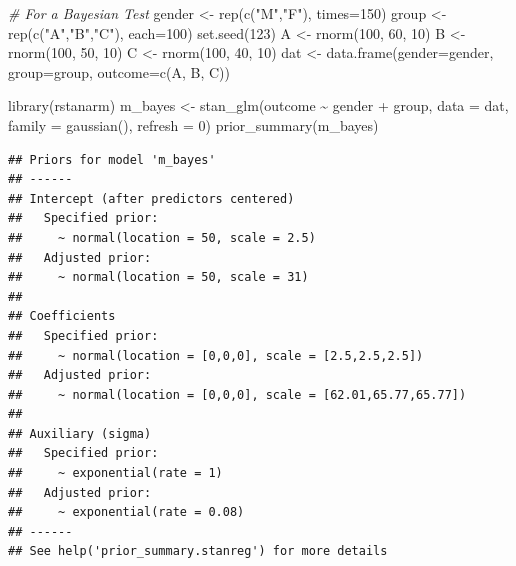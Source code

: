 \documentclass[
  ja=standard, xelatex, base=12pt]{bxjsreport}
\newenvironment{Shaded}{\begin{snugshade}}{\end{snugshade}}
\newcommand{\AttributeTok}[1]{\textcolor[rgb]{0.77,0.63,0.00}{#1}}
\newcommand{\CommentTok}[1]{\textcolor[rgb]{0.56,0.35,0.01}{\textit{#1}}}
\newcommand{\DecValTok}[1]{\textcolor[rgb]{0.00,0.00,0.81}{#1}}
\newcommand{\FunctionTok}[1]{\textcolor[rgb]{0.00,0.00,0.00}{#1}}
\newcommand{\NormalTok}[1]{#1}
\newcommand{\OtherTok}[1]{\textcolor[rgb]{0.56,0.35,0.01}{#1}}
\newcommand{\SpecialCharTok}[1]{\textcolor[rgb]{0.00,0.00,0.00}{#1}}
\newcommand{\StringTok}[1]{\textcolor[rgb]{0.31,0.60,0.02}{#1}}
\begin{document}
\begin{Shaded}
\begin{Highlighting}[]
\CommentTok{\# For a Bayesian Test }
\NormalTok{gender }\OtherTok{\textless{}{-}} \FunctionTok{rep}\NormalTok{(}\FunctionTok{c}\NormalTok{(}\StringTok{"M"}\NormalTok{,}\StringTok{"F"}\NormalTok{), }\AttributeTok{times=}\DecValTok{150}\NormalTok{)}
\NormalTok{group }\OtherTok{\textless{}{-}} \FunctionTok{rep}\NormalTok{(}\FunctionTok{c}\NormalTok{(}\StringTok{"A"}\NormalTok{,}\StringTok{"B"}\NormalTok{,}\StringTok{"C"}\NormalTok{), }\AttributeTok{each=}\DecValTok{100}\NormalTok{)}
\FunctionTok{set.seed}\NormalTok{(}\DecValTok{123}\NormalTok{)}
\NormalTok{A }\OtherTok{\textless{}{-}} \FunctionTok{rnorm}\NormalTok{(}\DecValTok{100}\NormalTok{, }\DecValTok{60}\NormalTok{, }\DecValTok{10}\NormalTok{)}
\NormalTok{B }\OtherTok{\textless{}{-}} \FunctionTok{rnorm}\NormalTok{(}\DecValTok{100}\NormalTok{, }\DecValTok{50}\NormalTok{, }\DecValTok{10}\NormalTok{)}
\NormalTok{C }\OtherTok{\textless{}{-}} \FunctionTok{rnorm}\NormalTok{(}\DecValTok{100}\NormalTok{, }\DecValTok{40}\NormalTok{, }\DecValTok{10}\NormalTok{)}
\NormalTok{dat }\OtherTok{\textless{}{-}} \FunctionTok{data.frame}\NormalTok{(}\AttributeTok{gender=}\NormalTok{gender, }\AttributeTok{group=}\NormalTok{group, }\AttributeTok{outcome=}\FunctionTok{c}\NormalTok{(A, B, C))}

\FunctionTok{library}\NormalTok{(rstanarm)}
\NormalTok{m\_bayes }\OtherTok{\textless{}{-}} \FunctionTok{stan\_glm}\NormalTok{(outcome }\SpecialCharTok{\textasciitilde{}}\NormalTok{ gender }\SpecialCharTok{+}\NormalTok{ group, }
                    \AttributeTok{data =}\NormalTok{ dat, }\AttributeTok{family =} \FunctionTok{gaussian}\NormalTok{(),}
                    \AttributeTok{refresh =} \DecValTok{0}\NormalTok{)}
\FunctionTok{prior\_summary}\NormalTok{(m\_bayes)}
\end{Highlighting}
\end{Shaded}

\begin{verbatim}
## Priors for model 'm_bayes' 
## ------
## Intercept (after predictors centered)
##   Specified prior:
##     ~ normal(location = 50, scale = 2.5)
##   Adjusted prior:
##     ~ normal(location = 50, scale = 31)
## 
## Coefficients
##   Specified prior:
##     ~ normal(location = [0,0,0], scale = [2.5,2.5,2.5])
##   Adjusted prior:
##     ~ normal(location = [0,0,0], scale = [62.01,65.77,65.77])
## 
## Auxiliary (sigma)
##   Specified prior:
##     ~ exponential(rate = 1)
##   Adjusted prior:
##     ~ exponential(rate = 0.08)
## ------
## See help('prior_summary.stanreg') for more details
\end{verbatim}
\end{document}
